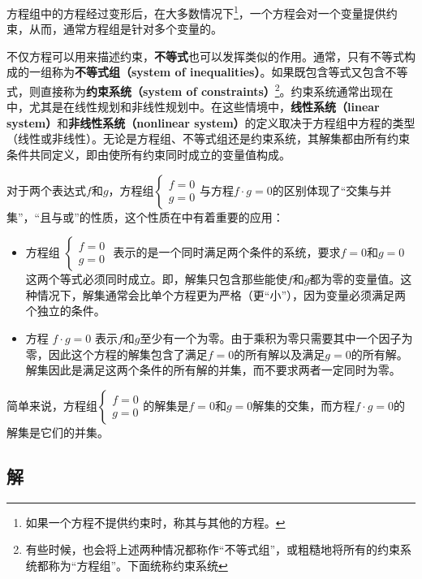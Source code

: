 方程组中的方程经过变形后，在大多数情况下\footnote{如果一个方程不提供约束时，称其与其他的方程。}，一个方程会对一个变量提供约束，从而，通常方程组是针对多个变量的。

不仅方程可以用来描述约束，\textbf{不等式}也可以发挥类似的作用。通常，只有不等式构成的一组称为\textbf{不等式组（system of inequalities）}。如果既包含等式又包含不等式，则直接称为\textbf{约束系统（system of constraints）}\footnote{有些时候，也会将上述两种情况都称作“不等式组”，或粗糙地将所有的约束系统都称为“方程组”。下面统称约束系统}。约束系统通常出现在中，尤其是在线性规划和非线性规划中。在这些情境中，\textbf{线性系统（linear system）}和\textbf{非线性系统（nonlinear system）}的定义取决于方程组中方程的类型（线性或非线性）。无论是方程组、不等式组还是约束系统，其解集都由所有约束条件共同定义，即由使所有约束同时成立的变量值构成。

对于两个表达式$f$和$g$，方程组$\begin{cases}f = 0 \\ g = 0\end{cases}$与方程$f \cdot g = 0$的区别体现了“交集与并集”，“且与或”的性质，这个性质在中有着重要的应用：

\begin{itemize}
\item 方程组 $\begin{cases}f = 0 \\ g = 0\end{cases}$ 表示的是一个同时满足两个条件的系统，要求$f = 0$和$g = 0$这两个等式必须同时成立。即，解集只包含那些能使$f$和$g$都为零的变量值。这种情况下，解集通常会比单个方程更为严格（更“小”），因为变量必须满足两个独立的条件。
\item 方程 $f \cdot g = 0$ 表示$f$和$g$至少有一个为零。由于乘积为零只需要其中一个因子为零，因此这个方程的解集包含了满足$f = 0$的所有解以及满足$g = 0$的所有解。解集因此是满足这两个条件的所有解的并集，而不要求两者一定同时为零。
\end{itemize}

简单来说，方程组$\begin{cases}f = 0 \\ g = 0\end{cases}$的解集是$f = 0$和$g = 0$解集的交集，而方程$f \cdot g = 0$的解集是它们的并集。

\subsection{解}\label{sub_HsEquN_1}

